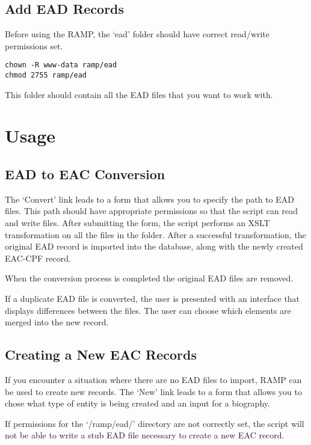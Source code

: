 \documentclass[11pt]{article}
\begin{document}
\subsection{Add EAD Records}
\label{sec-1-4}

   
   Before using the RAMP, the `ead' folder should have correct read/write permissions set.
   

\begin{verbatim}
chown -R www-data ramp/ead
chmod 2755 ramp/ead
\end{verbatim}
   
   This folder should contain all the EAD files that you want to work with.
      
\section{Usage}
\label{sec-2}
\subsection{EAD to EAC Conversion}
\label{sec-2-1}

   The `Convert' link leads to a form that allows you to specify the path to EAD files. This path should have appropriate permissions so that the script can read and write files.
   After submitting the form, the script performs an XSLT transformation on all the files in the folder. After a successful transformation, the original EAD record is imported into the 
   database, along with the newly created EAC-CPF record.

   When the conversion process is completed the original EAD files are removed. 

   If a duplicate EAD file is converted, the user is presented with an interface that displays differences between the files. The user can choose which elements are merged into the new record.
\subsection{Creating a New EAC Records}
\label{sec-2-2}

   If you encounter a situation where there are no EAD files to import, RAMP can be used to create new records. The `New' link leads to a form that allows you to chose what type of entity 
   is being created and an input for a biography. 

   If permissions for the `/ramp/ead/' directory are not correctly set, the script will not be able to write a stub EAD file necessary to create a 
   new EAC record. 
   
\end{document}
